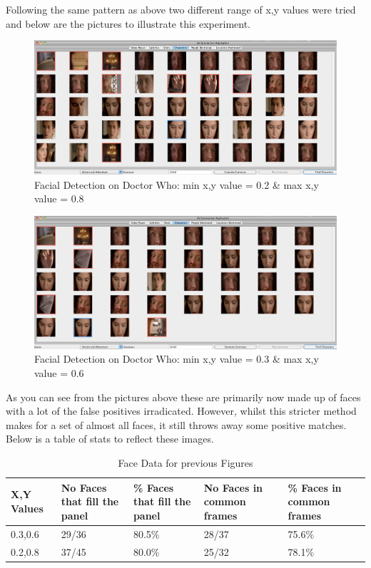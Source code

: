 \newpage
Following the same pattern as above two different range of x,y values were tried and below are the pictures to illustrate this experiment.

\begin{figure}[h1]
\begin{center}
 \includegraphics[trim = 0mm 0mm 0mm 0mm, clip,
 scale=0.19]{Images/pixels0208.png}
  \caption{Facial Detection on Doctor Who: min x,y value = 0.2 \& max x,y value = 0.8}
 \end{center}
\end{figure}

\begin{figure}[h1]
\begin{center}
 \includegraphics[trim = 0mm 0mm 0mm 0mm, clip,
 scale=0.19]{Images/pixels0306.png}
  \caption{Facial Detection on Doctor Who: min x,y value = 0.3 \& max x,y value = 0.6}
 \end{center}
\end{figure}

As you can see from the pictures above these are primarily now made up of faces with a lot of the false positives irradicated. However, whilst this stricter method makes for a set of almost all faces, it still throws away some positive matches. Below is a table of stats to reflect these images. 

\begin{table}[ht]
\begin{tabular}{|p{40pt} | p{82pt} | p{83pt} | p{82pt} | p{83pt} | }
\hline
X,Y Values & No Faces that fill the panel & \% Faces that fill the panel & No Faces in common frames & \% Faces in common frames \\\hline
0.3,0.6	&29/36	&80.5\%	&28/37	&75.6\% \\\hline
0.2,0.8	&37/45	&80.0\%	&25/32	&78.1\% \\\hline
\end{tabular}
\caption{Face Data for previous Figures}
\end{table}
\label{tab:PreviousFigures} 

